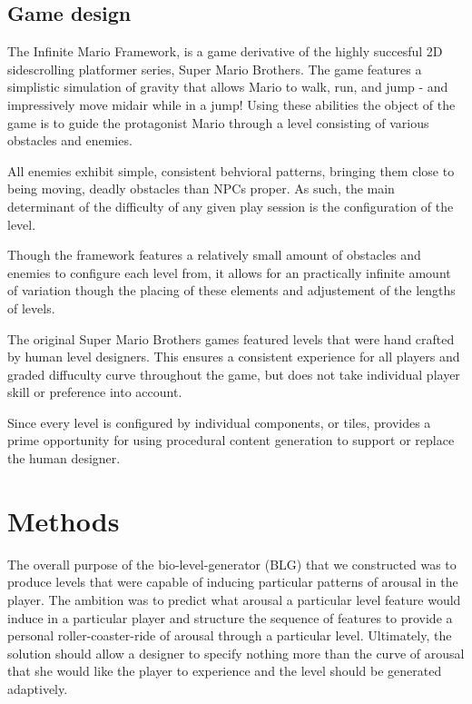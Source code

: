 \documentclass{llncs}
\begin{document}
\subsection{Game design}
The Infinite Mario Framework, is a game derivative of the highly succesful 2D sidescrolling platformer series, Super Mario Brothers. The game features a simplistic simulation of gravity that allows Mario to walk, run, and jump - and impressively move midair while in a jump! Using these abilities the object of the game is to guide the protagonist Mario through a level consisting of various obstacles and enemies.

All enemies exhibit simple, consistent behvioral patterns, bringing them close to being moving, deadly obstacles than NPCs proper. As such, the main determinant of the difficulty of any given play session is the configuration of the level.

Though the framework features a relatively small amount of obstacles and enemies to configure each level from, it allows for an practically infinite amount of variation though the placing of these elements and adjustement of the lengths of levels.

The original Super Mario Brothers games featured levels that were hand crafted by human level designers. This ensures a consistent experience for all players and graded diffuculty curve throughout the game, but does not take individual player skill or preference into account.

Since every level is configured by individual components, or tiles, provides a prime opportunity for using procedural content generation to support or replace the human designer.

\section{Methods}
The overall purpose of the bio-level-generator (BLG) that we constructed was to produce levels that were capable of inducing particular patterns of arousal in the player. The ambition was to predict what arousal a particular level feature would induce in a particular player and structure the sequence of features to provide a personal roller-coaster-ride of arousal through a particular level. Ultimately, the solution should allow a designer to specify nothing more than the curve of arousal that she would like the player to experience and the level should be generated adaptively.
\end{document}
